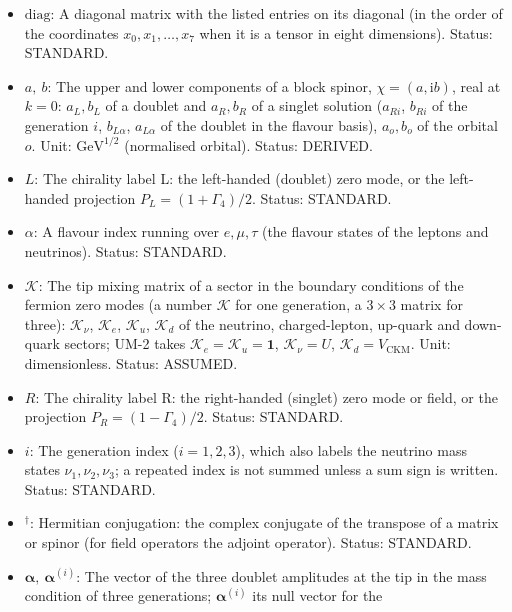 \documentclass[
  10pt,
]{article}
\providecommand{\tightlist}{%
  \setlength{\itemsep}{0pt}\setlength{\parskip}{0pt}}
\begin{document}
\begin{itemize}
\tightlist
\item
  \(\mathrm{diag}\): A diagonal matrix with the listed entries on its
  diagonal (in the order of the coordinates \(x_0, x_1, \dots, x_7\)
  when it is a tensor in eight dimensions). Status: STANDARD.
\item
  \(a,\ b\): The upper and lower components of a block spinor,
  \(\chi = (a, \mathrm{i}b)\), real at \(k = 0\): \(a_L, b_L\) of a
  doublet and \(a_R, b_R\) of a singlet solution (\(a_{Ri}\), \(b_{Ri}\)
  of the generation \(i\), \(b_{L\alpha}\), \(a_{L\alpha}\) of the
  doublet in the flavour basis), \(a_o, b_o\) of the orbital \(o\).
  Unit: \(\mathrm{GeV}^{1/2}\) (normalised orbital). Status: DERIVED.
\item
  \(L\): The chirality label L: the left-handed (doublet) zero mode, or
  the left-handed projection \(P_L = (1 + \Gamma_4)/2\). Status:
  STANDARD.
\item
  \(\alpha\): A flavour index running over \(e, \mu, \tau\) (the flavour
  states of the leptons and neutrinos). Status: STANDARD.
\item
  \(\mathcal{K}\): The tip mixing matrix of a sector in the boundary
  conditions of the fermion zero modes (a number \(\mathcal{K}\) for one
  generation, a \(3 \times 3\) matrix for three): \(\mathcal{K}_\nu\),
  \(\mathcal{K}_e\), \(\mathcal{K}_u\), \(\mathcal{K}_d\) of the
  neutrino, charged-lepton, up-quark and down-quark sectors; UM-2 takes
  \(\mathcal{K}_e = \mathcal{K}_u = \mathbf{1}\),
  \(\mathcal{K}_\nu = U\), \(\mathcal{K}_d = V_{\mathrm{CKM}}\). Unit:
  dimensionless. Status: ASSUMED.
\item
  \(R\): The chirality label R: the right-handed (singlet) zero mode or
  field, or the projection \(P_R = (1 - \Gamma_4)/2\). Status: STANDARD.
\item
  \(i\): The generation index (\(i = 1, 2, 3\)), which also labels the
  neutrino mass states \(\nu_1, \nu_2, \nu_3\); a repeated index is not
  summed unless a sum sign is written. Status: STANDARD.
\item
  \({}^\dagger\): Hermitian conjugation: the complex conjugate of the
  transpose of a matrix or spinor (for field operators the adjoint
  operator). Status: STANDARD.
\item
  \(\boldsymbol{\alpha},\ \boldsymbol{\alpha}^{(i)}\): The vector of the
  three doublet amplitudes at the tip in the mass condition of three
  generations; \(\boldsymbol{\alpha}^{(i)}\) its null vector for the

\end{itemize}
\end{document}
